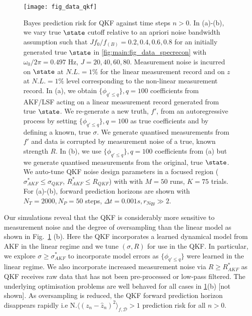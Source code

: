{\begin{figure}[h!]
    \texttt{[image: fig\_data\_qkf]}
    \caption{\label{fig:main:fig_data_qkf2} Bayes prediction risk for QKF against time steps $n>0$. In (a)-(b), we vary true $\state$ cutoff relative to an apriori noise bandwidth assumption such that $J f_0 / f_{(B)} = 0.2, 0.4, 0.6, 0.8$ for an initially generated true $\state$ in \cref{fig:main:fig_data_specrecon} with $\omega_0/ 2\pi = 0.497 $ Hz, $J = 20, 40, 60, 80$. Measurement noise is incurred on $\state$ at $N.L. = 1 \%$ for the linear measurement record and on $z$ at $N.L. = 1\%$ level corresponding to the non-linear measurement record. In (a), we obtain $\{\phi_{q' \leq q}\}, q=100$ coefficients from AKF/LSF acting on a linear measurement record generated from true $\state$. We re-generate a new truth, $f'$, from an autoregressive process by setting $\{\phi_{q'\leq q}\}, q=100$ as true coefficients and by defining a known, true $\sigma$. We generate quantised measurements from $f'$ and data is corrupted by measurement noise of a true, known strength $R$. In (b), we use $\{\phi_{q' \leq q} \}, q=100$ coefficients from (a) but we generate quantised measurements from the original, true $\state$. We auto-tune QKF noise design parameters in a focused region ($\sigma_{AKF}^* \leq \sigma_{QKF}$, $R_{AKF}^* \leq R_{QKF}$) with with $M=50$ runs, $K=75$ trials. For (a)-(b), forward prediction horizons are shown with $N_T = 2000, N_P = 50$ steps, $\Delta t = 0.001s, r_{Nqy}\gg 2$.}
\end{figure}



Our simulations reveal that the QKF is considerably more sensitive to measurement noise and the degree of oversampling than the linear model as shown in Fig.~\ref{fig:main:fig_data_qkf2} (b). Here the QKF incorporates a learned dynamical model from AKF in the linear regime and we tune $(\sigma, R)$ for use in the QKF.  In particular, we explore $\sigma \geq \sigma_{AKF}^*$ to incorporate model errors as $\{\phi_{q' \leq q}\}$ were learned in the linear regime.  We also incorporate increased measurement noise via $R \geq R_{AKF}^*$ as QKF receives raw data that has not been pre-processed or low-pass filtered. The underlying optimisation problems are well behaved for all cases in \cref{fig:main:fig_data_qkf2}(b) [not shown].  As oversampling is reduced, the QKF forward prediction horizon disappears rapidly i.e $\text{N.} \langle (z_n - \hat{z}_n)^2 \rangle_{f, \mathcal{D}} > 1 $ prediction risk for all $n>0$.  




}
